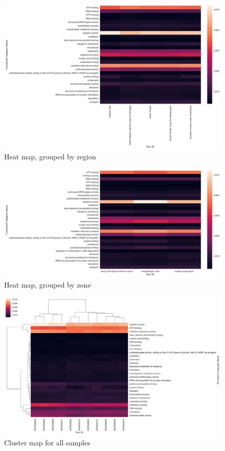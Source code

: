 \documentclass[12pt,a4paper,twocolumn]{article}
\begin{document}
\begin{figure}
\centering
\includegraphics{imgs/heat/heat_region.png}
\caption{Heat map, grouped by region\label{fig:heat_region}}
\end{figure}

\begin{figure}
\centering
\includegraphics{imgs/heat/heat_zone.png}
\caption{Heat map, grouped by zone\label{fig:heat_zone}}
\end{figure}

\begin{figure}
\centering
\includegraphics{imgs/cluster/cluster_all.png}
\caption{Cluster map for all samples\label{fig:cluster_all}}
\end{figure}
\end{document}
